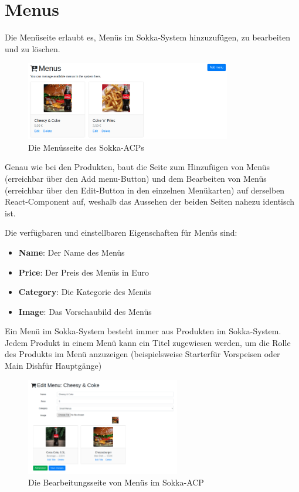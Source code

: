 \section{Menus}

Die Menüseite erlaubt es, Menüs im Sokka-System hinzuzufügen, zu bearbeiten und zu löschen.

\begin{figure}[ht]
    \centering
    \includegraphics[width=0.8\textwidth]{images/ACP/menus.png}
    \caption{Die Menüsseite des Sokka-ACPs}
\end{figure}

Genau wie bei den Produkten, baut die Seite zum Hinzufügen von Menüs (erreichbar über den \glqq Add menu\grqq -Button) und dem Bearbeiten von Menüs (erreichbar über den \glqq Edit\grqq -Button in den einzelnen Menükarten) auf derselben React-Component auf, weshalb das Aussehen der beiden Seiten nahezu identisch ist.

Die verfügbaren und einstellbaren Eigenschaften für Menüs sind:

\begin{itemize}
    \item \textbf{Name}: Der Name des Menüs
    \item \textbf{Price}: Der Preis des Menüs in Euro
    \item \textbf{Category}: Die Kategorie des Menüs
    \item \textbf{Image}: Das Vorschaubild des Menüs
\end{itemize}

Ein Menü im Sokka-System besteht immer aus Produkten im Sokka-System. Jedem Produkt in einem Menü kann ein Titel zugewiesen werden, um die Rolle des Produkts im Menü anzuzeigen (beispielsweise \glqq Starter\grqq\space für Vorspeisen oder \glqq Main Dish\grqq\space für Hauptgänge)

\begin{figure}[ht]
    \centering
    \includegraphics[width=0.6\textwidth]{images/ACP/menus_edit.png}
    \caption{Die Bearbeitungsseite von Menüs im Sokka-ACP}
\end{figure}

